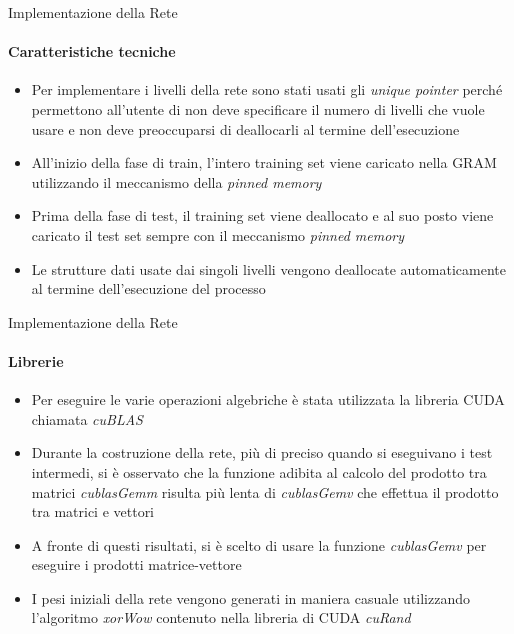 \documentclass[
 ]{beamer}
\begin{document}
\begin{frame}{Implementazione della Rete}
    \framesubtitle{Caratteristiche tecniche}
      \begin{itemize} [<+->] 
        \setlength\itemsep{1em}           
            \item \large Per implementare i livelli della rete sono stati usati gli \emph{unique pointer} perché permettono all'utente di non deve specificare il numero di livelli che vuole usare e non deve preoccuparsi di deallocarli al termine dell'esecuzione           
            \item \large All'inizio della fase di train, l'intero training set viene caricato nella GRAM utilizzando il meccanismo della \emph{pinned memory}
             \item \large Prima della fase di test, il training set viene deallocato e al suo posto viene caricato il test set sempre con il meccanismo \emph{pinned memory}
            \item \large Le strutture dati usate dai singoli livelli vengono deallocate automaticamente al termine dell'esecuzione del processo
        \end{itemize}
\end{frame}

\begin{frame}{Implementazione della Rete}
    \framesubtitle{Librerie}
      \begin{itemize} [<+->] 
        \setlength\itemsep{1em}           
            \item \large Per eseguire le varie operazioni algebriche è stata utilizzata la libreria CUDA chiamata \emph{cuBLAS}
            \item \large Durante la costruzione della rete, più di preciso quando si eseguivano i test intermedi, si è osservato che la funzione adibita al calcolo del prodotto tra matrici \emph{cublasGemm} risulta più lenta di \emph{cublasGemv} che effettua il prodotto tra matrici e vettori
            \item \large A fronte di questi risultati, si è scelto di usare la funzione \emph{cublasGemv} per eseguire i prodotti matrice-vettore
            \item \large I pesi iniziali della rete vengono generati in maniera casuale utilizzando l'algoritmo \emph{xorWow} contenuto nella libreria di CUDA \emph{cuRand}
        \end{itemize}
\end{frame}
\end{document}
